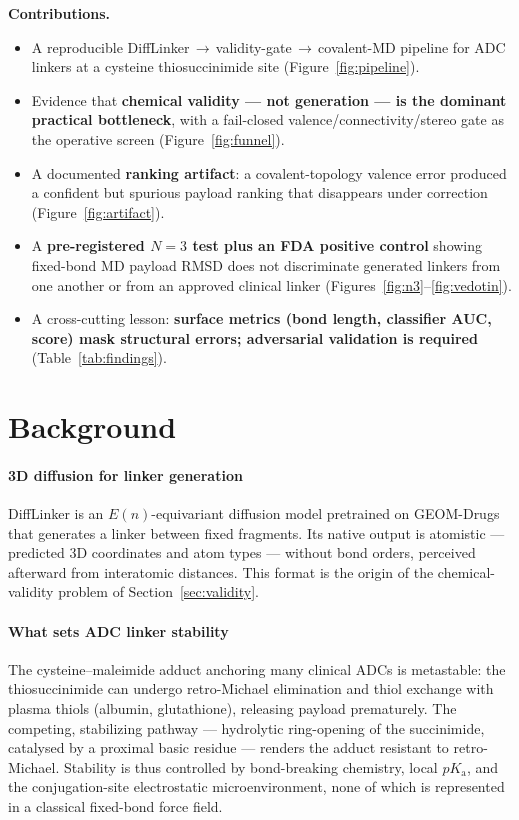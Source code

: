 \documentclass[10pt,twocolumn]{article}
\begin{document}
\noindent\textbf{Contributions.}
\begin{itemize}[leftmargin=1.1em,itemsep=1pt,topsep=2pt]
\item A reproducible DiffLinker\,$\rightarrow$\,validity-gate\,$\rightarrow$\,covalent-MD pipeline for ADC
linkers at a cysteine thiosuccinimide site (Figure~\ref{fig:pipeline}).
\item Evidence that \textbf{chemical validity --- not generation --- is the dominant practical
bottleneck}, with a fail-closed valence/connectivity/stereo gate as the operative screen
(Figure~\ref{fig:funnel}).
\item A documented \textbf{ranking artifact}: a covalent-topology valence error produced a confident but
spurious payload ranking that disappears under correction (Figure~\ref{fig:artifact}).
\item A \textbf{pre-registered $N{=}3$ test plus an FDA positive control} showing fixed-bond MD payload
RMSD does not discriminate generated linkers from one another or from an approved clinical linker
(Figures~\ref{fig:n3}--\ref{fig:vedotin}).
\item A cross-cutting lesson: \textbf{surface metrics (bond length, classifier AUC, score) mask
structural errors; adversarial validation is required} (Table~\ref{tab:findings}).
\end{itemize}

\section{Background}

\paragraph{3D diffusion for linker generation}
DiffLinker\cite{igashov2024} is an $E(n)$-equivariant diffusion model pretrained on
GEOM-Drugs\cite{axelrod2022} that generates a linker between fixed fragments. Its native output is
atomistic --- predicted 3D coordinates and atom types --- without bond orders, perceived afterward from
interatomic distances. This format is the origin of the chemical-validity problem of
Section~\ref{sec:validity}.

\paragraph{What sets ADC linker stability}
The cysteine--maleimide adduct anchoring many clinical ADCs is metastable: the thiosuccinimide can
undergo retro-Michael elimination and thiol exchange with plasma thiols (albumin, glutathione), releasing
payload prematurely.\cite{shen2012} The competing, stabilizing pathway --- hydrolytic ring-opening of the
succinimide, catalysed by a proximal basic residue --- renders the adduct resistant to
retro-Michael.\cite{lyon2014} Stability is thus controlled by bond-breaking chemistry, local
$pK_\mathrm{a}$, and the conjugation-site electrostatic microenvironment, none of which is represented in
a classical fixed-bond force field.
\end{document}
